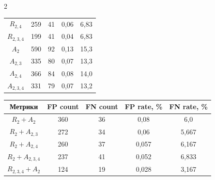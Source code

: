 \begin{multicols}{2}
\begin{table}[b]
\begin{center}
\begin{tabular}{|c|c|c|c|c|}
 $R_{2,4}$ & 259& 41& 0,06& 6,83\\

 $R_{2,3,4}$ &  199& 41& 0,04& 6,83\\

 $A_2$ &  590& 92& 0,13& 15,3\\

 $A_{2,3}$ &  335& 80& 0,07& 13,3\\

 $A_{2,4}$ &  366& 84& 0,08 & 14,0 \\

 $A_{2,3,4}$ & 331& 79& 0,07& 13,2\\

        \hline

          \end{tabular}

    \end{center}



\begin{center}


    \label{res_sum}

    \vspace*{2ex}

    


  \begin{tabular}{|c|c|c|c|c|}

                    \hline

                    Метрики& FP count& FN count & FP rate, \% & FN rate, \%\\

                    \hline

$R_2 + A_2$ & 360& 36& 0,08\hphantom{9}& 6,0\hphantom{99}\\

$R_2 + A_{2,3}$ & 272& 34& 0,06\hphantom{9}& 5,667\\

 $R_2 + A_{2,4}$ &  260& 37& 0,057& 6,167\\

 $R_2 + A_{2,3,4}$ & 237& 41& 0,052& 6,833\\

$R_{2,3,4} + A_2$ & 124& 19& 0,028& 3,167\\


\end{tabular}
\end{center}
\end{table}
\end{multicols}
